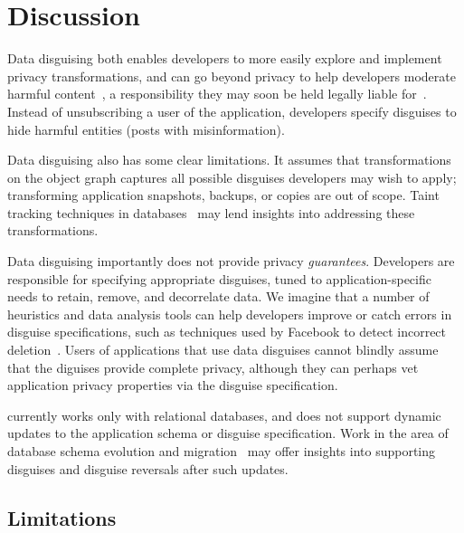 \section{Discussion}
Data disguising both enables developers to more easily explore and implement privacy
transformations, and can go beyond privacy to help developers moderate harmful
content~\cite{contentmod, sasb}, a responsibility they may soon be held legally liable
for~\cite{nytimes:230}. Instead of unsubscribing a user of the application, developers specify
disguises to hide harmful entities (\eg posts with misinformation).

Data disguising also has some clear limitations. It assumes that transformations on the object graph
captures all possible disguises developers may wish to apply; transforming application
snapshots, backups, or copies are out of scope. Taint tracking techniques in
databases~\cite{schengendb} may lend insights into addressing these transformations.

Data disguising importantly does not provide privacy \emph{guarantees}. Developers are responsible for
specifying appropriate disguises, tuned to application-specific needs to retain, remove, and decorrelate
data. 
We imagine that a number of heuristics and data analysis tools can help developers improve or catch
errors in disguise specifications, such as techniques used by Facebook to detect incorrect
deletion~\cite{delf}.  Users of applications that use data disguises cannot blindly assume that the
diguises provide complete privacy, although they can perhaps vet application privacy properties via the
disguise specification.

\sys currently works only with relational databases, and does not support dynamic
updates to the application schema or disguise specification.
Work in the area of database schema evolution and migration~\cite{schema:evo} may offer insights
into supporting disguises and disguise reversals after such updates.

\iffalse
\subsection{Limitations}

